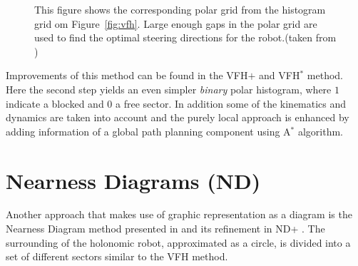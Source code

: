 \begin{figure}[thpb]
	  \myfloatalign
      \footnotesize
      \centering
   \caption[Vector Field Polar Histogram.]{This figure shows the corresponding polar grid from the histogram grid om Figure~\ref{fig:vfh}. Large enough gaps in the polar grid are used to find the optimal steering directions for the robot.(taken from \cite{borenstein1991vector})}
   \label{fig:polar}
\end{figure}

Improvements of this method can be found in the VFH$+$ \cite{ulrich1998vfh+} and VFH$^*$ \cite{ulrich2000vfh} method. 
Here the second step yields an even simpler \emph{binary} polar histogram, where $1$ indicate a blocked and $0$ a free sector. 
In addition some of the kinematics and dynamics are taken into account and the purely local approach is enhanced by adding information of a global path planning component using A$^*$ algorithm. 

\section{Nearness Diagrams (ND)}
Another approach that makes use of graphic representation as a diagram is the Nearness Diagram method presented in \cite{minguez2004nearness} and its refinement in ND+ \cite{minguez2004divide}.
The surrounding of the holonomic robot, approximated as a circle, is divided into a set of different sectors similar to the VFH method.

